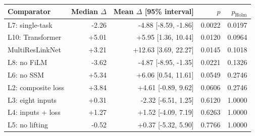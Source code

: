 \begin{tabular}{lrrrr}\toprule
Comparator & Median $\Delta$ & Mean $\Delta$ [95\% interval] & $p$ & $p_{\mathrm{Holm}}$\\\midrule
L7: single-task & -2.26 & -4.88 [-8.59, -1.86] & 0.0022 & 0.0197 \\
L10: Transformer & +5.01 & +5.95 [1.36, 10.44] & 0.0120 & 0.0964 \\
MultiResLinkNet & +3.21 & +12.63 [3.69, 22.27] & 0.0145 & 0.1018 \\
L8: no FiLM & -3.62 & -4.87 [-8.95, -1.35] & 0.0221 & 0.1326 \\
L6: no SSM & +5.34 & +6.06 [0.54, 11.61] & 0.0549 & 0.2746 \\
L2: composite loss & +3.84 & +4.61 [-0.89, 9.62] & 0.0606 & 0.2746 \\
L3: eight inputs & +0.31 & -2.32 [-6.51, 1.25] & 0.6120 & 1.0000 \\
L4: inputs + loss & +1.27 & +1.52 [-4.09, 7.19] & 0.6263 & 1.0000 \\
L5: no lifting & -0.52 & +0.37 [-5.32, 5.90] & 0.7766 & 1.0000 \\
\bottomrule\end{tabular}
